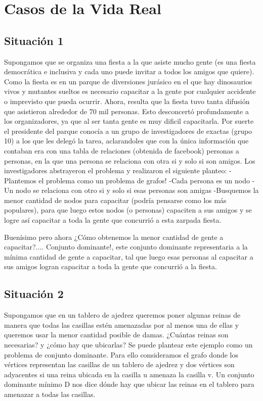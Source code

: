 \section{Casos de la Vida Real}

\subsection{Situación 1}
Supongamos que se organiza una fiesta a la que asiste mucho gente (es una fiesta democrática e inclusiva y cada uno puede invitar a todos los amigos que quiere). Como la fiesta es en un parque de diversiones jurásico en el que hay dinosaurios vivos y mutantes sueltos es necesario capacitar a la gente por cualquier accidente o imprevisto que pueda ocurrir. Ahora, resulta que la fiesta tuvo tanta difusión que asistieron alrededor de 70 mil personas. Esto desconcertó profundamente a los organizadores, ya que al ser tanta gente es muy dificil capacitarla. Por suerte el presidente del parque conocía a un grupo de investigadores de exactas (grupo 10) a los que les delegó la tarea, aclarandoles que con la única información que contaban era con una tabla de relaciones (obtenida de facebook) personas a personas, en la que una persona se relaciona con otra si y solo si son amigos.
Los investigadores abstrayeron el problema y realizaron el siguiente planteo:
-Plantemos el problema como un problema de grafos!
-Cada persona es un nodo
-Un nodo se relaciona con otro si y solo si esas personas son amigas
-Busquemos la menor cantidad de nodos para capacitar (podría pensarse como los más populares), para que luego estos nodos (o personas) capaciten a sus amigos y se logre así capacitar a toda la gente que concurrió a esta zarpada fiesta.

Buenísimo pero ahora ¿Cómo obtenemos la menor cantidad de gente a capacitar?.... Conjunto dominante!, este conjunto dominante representaria a la mínima cantidad de gente a capacitar, tal que luego esas personas al capacitar a sus amigos logran capacitar a toda la gente que concurrió a la fiesta.

\subsection{Situación 2}
Supongamos que en un tablero de ajedrez queremos poner algunas reinas de manera que todas las casillas estén amenazadas por al menos una de ellas y queremos usar la menor cantidad posible de damas. ¿Cuántas reinas son necesarias? y ¿cómo hay que ubicarlas? Se puede plantear este ejemplo como un problema de conjunto dominante. Para ello
consideramos el grafo donde los vértices representan las casillas de un tablero de ajedrez y dos vértices son adyacentes si una reina ubicada en la casilla u amenaza la casilla v. Un conjunto dominante mínimo D nos dice dónde hay que ubicar las reinas en el tablero para amenazar a todas las casillas. 

